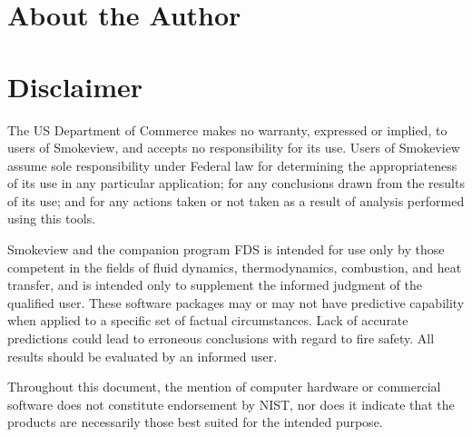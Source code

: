 \documentclass[11pt,twoside]{book}
\begin{document}
\chapter{About the Author}

\begin{description}
\gforneybio
\end{description}


\chapter{Disclaimer}

The US Department of Commerce makes no warranty,
expressed or implied, to users of Smokeview, and accepts no
responsibility for its use. Users of Smokeview assume sole
responsibility under Federal law for determining the
appropriateness of its use in any particular application; for any
conclusions drawn from the results of its use; and for any actions
taken or not taken as a result of analysis performed using this
tools.

Smokeview and the companion program FDS is intended for use only
by those competent in the fields of fluid dynamics,
thermodynamics, combustion, and heat transfer, and is intended
only to supplement the informed judgment of the qualified user.
These software packages may or may not have predictive capability
when applied to a specific set of factual circumstances. Lack of
accurate predictions could lead to erroneous conclusions with
regard to fire safety. All results should be evaluated by an
informed user.

Throughout this document, the mention of computer hardware or
commercial software does not constitute endorsement by NIST,
nor does
it indicate that the products are necessarily those
best suited for the
intended purpose.

\cleardoublepage
\tableofcontents

\cleardoublepage
\listoffigures

\mainmatter


\end{document}
